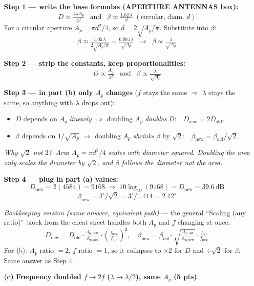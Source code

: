 \documentclass[11pt,letterpaper]{article}
\begin{document}
\textbf{Step 1 --- write the base formulas (APERTURE ANTENNAS box):}
\[D \approx \tfrac{4\pi A_p}{\lambda^2}\;\;\;\text{and}\;\;\;\beta \approx \tfrac{1.02\,\lambda}{d}\;(\text{circular, diam.\ }d)\]
For a circular aperture $A_p\!=\!\pi d^2/4$, so $d\!=\!2\sqrt{A_p/\pi}$. Substitute into $\beta$:
\[\beta \approx \tfrac{1.02\,\lambda}{2\sqrt{A_p/\pi}} = \tfrac{0.904\,\lambda}{\sqrt{A_p}}\;\;\Rightarrow\;\;\beta \propto \tfrac{\lambda}{\sqrt{A_p}}\]

\textbf{Step 2 --- strip the constants, keep proportionalities:}
\[\boxed{D \propto \tfrac{A_p}{\lambda^2}}\;\;\;\text{and}\;\;\;\boxed{\beta \propto \tfrac{\lambda}{\sqrt{A_p}}}\]

\textbf{Step 3 --- in part (b) only $A_p$ changes} ($f$ stays the same $\Rightarrow$ $\lambda$ stays the same, so anything with $\lambda$ drops out):
\begin{itemize}\setlength{\itemsep}{0pt}
\item $D$ depends on $A_p$ \emph{linearly} $\Rightarrow$ doubling $A_p$ \emph{doubles} $D$:\ \ $D_\text{new}\!=\!2D_\text{old}$.
\item $\beta$ depends on $1/\sqrt{A_p}$ $\Rightarrow$ doubling $A_p$ \emph{shrinks} $\beta$ by $\sqrt{2}$:\ \ $\beta_\text{new}\!=\!\beta_\text{old}/\sqrt{2}$.
\end{itemize}

\textit{\color{coral}Why $\sqrt{2}$ not $2$?\ Area $A_p\!=\!\pi d^2/4$ scales with diameter squared. Doubling the area only scales the diameter by $\sqrt{2}$, and $\beta$ follows the diameter not the area.}

\textbf{Step 4 --- plug in part (a) values:}
\[D_{\text{new}} = 2(4584) = 9168 \;\Rightarrow\; 10\log_{10}(9168) = \boxed{D_{\text{new}} = 39.6~\text{dB}}\]
\[\beta_{\text{new}} = 3^\circ/\sqrt{2} = 3^\circ/1.414 = \boxed{2.12^\circ}\]

\textit{Bookkeeping version (same answer, equivalent path)} --- the general ``Scaling (any ratio)'' block from the cheat sheet handles both $A_p$ and $f$ changing at once:
\[D_{\text{new}} = D_{\text{old}} \cdot \tfrac{A_{p,\text{new}}}{A_{p,\text{old}}} \cdot \!\left(\tfrac{f_{\text{new}}}{f_{\text{old}}}\right)^{\!2},\quad \beta_{\text{new}} = \beta_{\text{old}} \cdot \sqrt{\tfrac{A_{p,\text{old}}}{A_{p,\text{new}}}} \cdot \tfrac{f_{\text{old}}}{f_{\text{new}}}\]
For (b): $A_p$ ratio $= 2$, $f$ ratio $= 1$, so it collapses to $\times 2$ for $D$ and $\div\sqrt{2}$ for $\beta$. Same answer as Step 4.

\vspace{6pt}
\textbf{(c) Frequency doubled $f \to 2f$ ($\lambda \to \lambda/2$), same $A_p$ (5 pts)}
\end{document}
